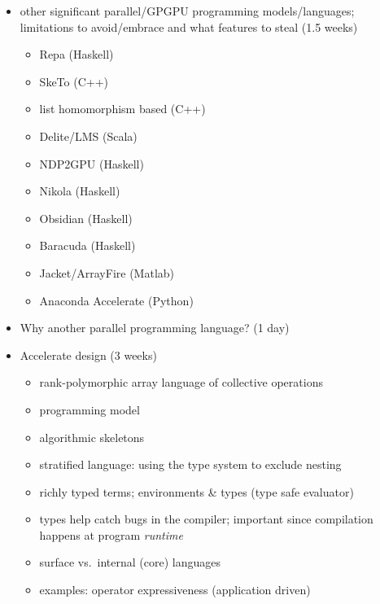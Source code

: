\begin{itemize}
\item other significant parallel/GPGPU programming models/languages; limitations
    to avoid/embrace and what features to steal (1.5 weeks)
    \begin{itemize}
        \item Repa \cite{Keller:2010er,Lippmeier:2011cd,Lippmeier:2012gx} (Haskell)
        \item SkeTo \cite{Matsuzaki:2011ew} (C++)
        \item list homomorphism based \cite{Sato:2009cq} (C++)
        \item Delite/LMS \cite{Rompf:2013er} (Scala)
        \item NDP2GPU \cite{Bergstrom:2012bi} (Haskell)
        \item Nikola \cite{Mainland:2010vj} (Haskell)
        \item Obsidian \cite{Svensson:2008a,Claessen:2012hl} (Haskell)
        \item Baracuda \cite{Larsen:2011fa} (Haskell)
        \item Jacket/ArrayFire \cite{AccelerEyes:vq} (Matlab)
        \item Anaconda Accelerate \cite{AnacondaAccelerate:2013vn} (Python)
    \end{itemize}

    \item Why another parallel programming language? (1 day)

    \item Accelerate design (3 weeks)
        \begin{itemize}
            \item rank-polymorphic array language of collective operations
            \item programming model
            \item algorithmic skeletons
            \item stratified language: using the type system to exclude nesting
            \item richly typed terms; environments \& types (type safe evaluator)
            \item types help catch bugs in the compiler; important since
                compilation happens at program \emph{runtime}
            \item surface vs.\ internal (core) languages
            \item examples: operator expressiveness (application driven)
        \end{itemize}

\end{itemize}


